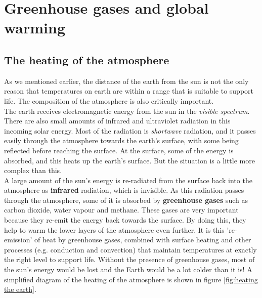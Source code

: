 \section{Greenhouse gases and global warming}
\label{sec:atmosphere:greenhouse}

\subsection{The heating of the atmosphere}

As we mentioned earlier, the distance of the earth from the sun is not the only reason that temperatures on earth are within a range that is suitable to support life. The composition of the atmosphere is also critically important. \\

The earth receives electromagnetic energy from the sun in the \textit{visible spectrum}. There are also small amounts of infrared and ultraviolet radiation in this incoming solar energy. Most of the radiation is \textit{shortwave} radiation, and it passes easily through the atmosphere towards the earth's surface, with some being reflected before reaching the surface. At the surface, some of the energy is absorbed, and this heats up the earth's surface. But the situation is a little more complex than this. \\

A large amount of the sun's energy is re-radiated from the surface back into the atmosphere as \textbf{infrared} radiation, which is invisible. As this radiation passes through the atmosphere, some of it is absorbed by \textbf{greenhouse gases} such as carbon dioxide, water vapour and methane. These gases are very important because they re-emit the energy back towards the surface. By doing this, they help to warm the lower layers of the atmosphere even further. It is this 're-emission' of heat by greenhouse gases, combined with surface heating and other processes (e.g. conduction and convection) that maintain temperatures at exactly the right level to support life. Without the presence of greenhouse gases, most of the sun's energy would be lost and the Earth would be a lot colder than it is! A simplified diagram of the heating of the atmosphere is shown in figure \ref{fig:heating the earth}.


